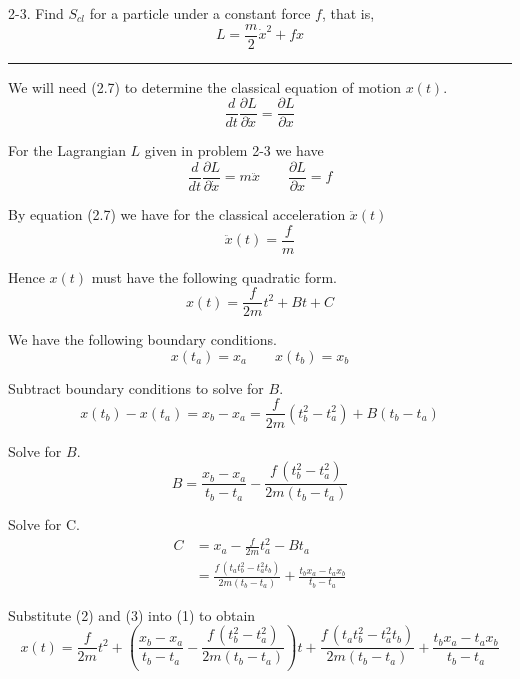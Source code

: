 \documentclass[12pt]{article}
\begin{document}
2-3.
Find $S_{cl}$ for a particle under a constant force $f$, that is,
\begin{equation*}
L=\frac{m}{2}\dot x^2+fx
\end{equation*}

\bigskip
\hrule

\bigskip
We will need (2.7) to determine the classical equation of motion $x(t)$.
\begin{equation*}
\frac{d}{dt}\frac{\partial L}{\partial\dot x}=\frac{\partial L}{\partial x}
\tag{2.7}
\end{equation*}

For the Lagrangian $L$ given in problem 2-3 we have
\begin{equation*}
\frac{d}{dt}\frac{\partial L}{\partial\dot x}=m\ddot x
\qquad
\frac{\partial L}{\partial x}=f
\end{equation*}

By equation (2.7) we have for the classical acceleration $\ddot x(t)$
\begin{equation*}
\ddot x(t)=\frac{f}{m}
\end{equation*}

Hence $x(t)$ must have the following quadratic form.
\begin{equation*}
x(t)=\frac{f}{2m}t^2+Bt+C
\tag{1}
\end{equation*}

We have the following boundary conditions.
\begin{equation*}
x(t_a)=x_a
\qquad
x(t_b)=x_b
\end{equation*}

Subtract boundary conditions to solve for $B$.
\begin{equation*}
x(t_b)-x(t_a)
=x_b-x_a
=\frac{f}{2m}\left(t_b^2-t_a^2\right)+B(t_b-t_a)
\end{equation*}

Solve for $B$.
\begin{equation*}
B=\frac{x_b-x_a}{t_b-t_a}-\frac{f\,\left(t_b^2-t_a^2\right)}{2m(t_b-t_a)}
\tag{2}
\end{equation*}

Solve for C.
\begin{align*}
C&=x_a-\frac{f}{2m}t_a^2-Bt_a
\\[1ex]
&=\frac{f\,\left(t_a t_b^2 - t_a^2 t_b\right)}{2 m (t_b - t_a)} + \frac{t_b x_a - t_a x_b}{t_b - t_a}
\tag{3}
\end{align*}

Substitute (2) and (3) into (1) to obtain
\begin{equation*}
x(t)=
\frac{f}{2m}t^2
+\left(\frac{x_b-x_a}{t_b-t_a}-\frac{f\,\left(t_b^2-t_a^2\right)}{2m(t_b-t_a)}\right)t
+\frac{f\,\left(t_a t_b^2 - t_a^2 t_b\right)}{2 m (t_b - t_a)} + \frac{t_b x_a - t_a x_b}{t_b - t_a}
\tag{4}
\end{equation*}
\end{document}
